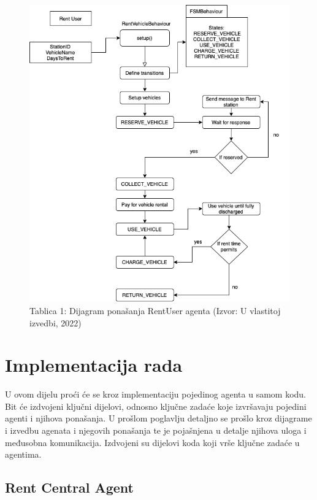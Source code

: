 \documentclass{foi}
\begin{document}
\begin{figure}[h!]
	\centering
	\includegraphics[width=1\textwidth]{slike/rentUser.png}
	\caption{Tablica 1: Dijagram ponašanja RentUser agenta (Izvor: U vlastitoj izvedbi, 2022)}
\end{figure}


\chapter{Implementacija rada}

U ovom dijelu proći će se kroz implementaciju pojedinog agenta u samom kodu. Bit će izdvojeni ključni dijelovi, odnosno ključne zadaće koje izvršavaju pojedini agenti i njihova ponašanja. U prošlom poglavlju detaljno se prošlo kroz dijagrame i izvedbu agenata i njegovih ponašanja te je pojašnjena u detalje njihova uloga i međusobna komunikacija. Izdvojeni su dijelovi koda koji vrše ključne zadaće u agentima.

\section{Rent Central Agent}
\end{document}
